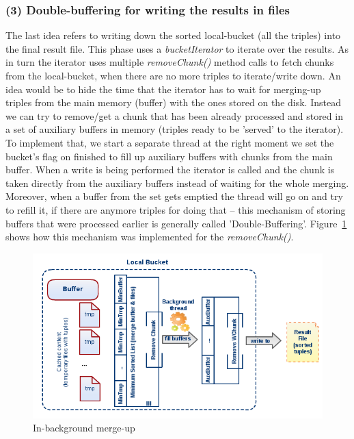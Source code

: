 % 
\subsubsection*{(3) Double-buffering for writing the results in files}

The last idea refers to writing down the sorted local-bucket (all the triples) into the final result file. This phase uses a \textit{bucketIterator} to iterate over the results. As in turn the iterator uses multiple \textit{removeChunk()} method calls to fetch chunks from the local-bucket, when there are no more triples to iterate/write down. An idea would be to hide the time that the iterator has to wait for merging-up triples from the main memory (buffer) with the ones stored on the disk. Instead we can try to remove/get a chunk that has been already processed and stored in a set of auxiliary buffers in memory (triples ready to be 'served' to the iterator). To implement that, we start a separate thread at the right moment we set the bucket's flag on finished to fill up auxiliary buffers with chunks from the main buffer. When a write is being performed the iterator is called and the chunk is taken directly from the auxiliary buffers instead of waiting for the whole merging. Moreover, when a buffer from the set gets emptied the thread will go on and try to refill it, if there are anymore triples for doing that -- this mechanism of storing buffers that were processed earlier is generally called 'Double-Buffering'. Figure~\ref{fig:diag5} shows how this mechanism was implemented for the \textit{removeChunk()}. 

\begin{figure}
\centering
\includegraphics[scale=0.6]{diag5}
\caption{In-background merge-up}
\label{fig:diag5}
\end{figure}

